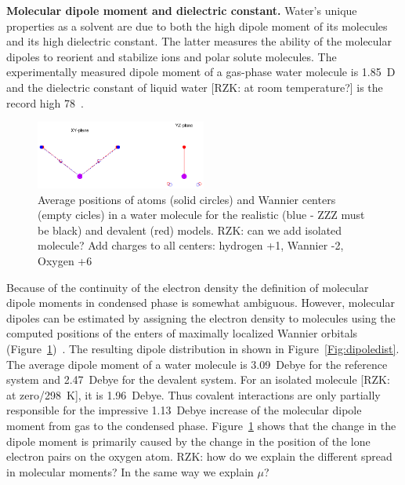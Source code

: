 \documentclass[aps,prl,reprint,amsmath,amssymb]{revtex4-1}
\begin{document}
\textbf{Molecular dipole moment and dielectric constant.} Water's unique properties as a solvent are due to both the high dipole moment of its molecules and its high dielectric constant. The latter measures the ability of the molecular dipoles to reorient and stabilize ions and polar solute molecules. The experimentally measured dipole moment of a gas-phase water molecule is 1.85~D~\cite{CRC} and the dielectric constant of liquid water [RZK: at room temperature?] is the record high 78~\cite{CRC?}.

\begin{figure}
\includegraphics[width=0.5\textwidth]{acoord}
\caption{Average positions of atoms (solid circles) and Wannier centers (empty cicles) in a water molecule for the realistic (blue - ZZZ must be black) and devalent (red) models. RZK: can we add isolated molecule? Add charges to all centers: hydrogen +1, Wannier -2, Oxygen +6} \label{Fig:acoord}
\end{figure}

 
Because of the continuity of the electron density the definition of molecular dipole moments in condensed phase is somewhat ambiguous. However, molecular dipoles can be estimated by assigning the electron density to molecules using the computed positions of the enters of maximally localized Wannier orbitals (Figure~\ref{Fig:acoord})~\cite{RZK}. 
The resulting dipole distribution in shown in Figure~\ref{Fig:dipoledist}. 
The average dipole moment of a water molecule is 3.09~Debye for the reference system and 2.47~Debye for the devalent system. For an isolated molecule [RZK: at zero/298~K], it is 1.96~Debye. 
Thus covalent interactions are only partially responsible for the impressive 1.13~Debye increase of the molecular dipole moment from gas to the condensed phase. 
Figure~\ref{Fig:acoord} shows that the change in the dipole moment is primarily caused by the change in the position of the lone electron pairs on the oxygen atom.
\new
RZK: how do we explain the different spread in molecular moments? In the same way we explain $\mu$?
\old
\end{document}
